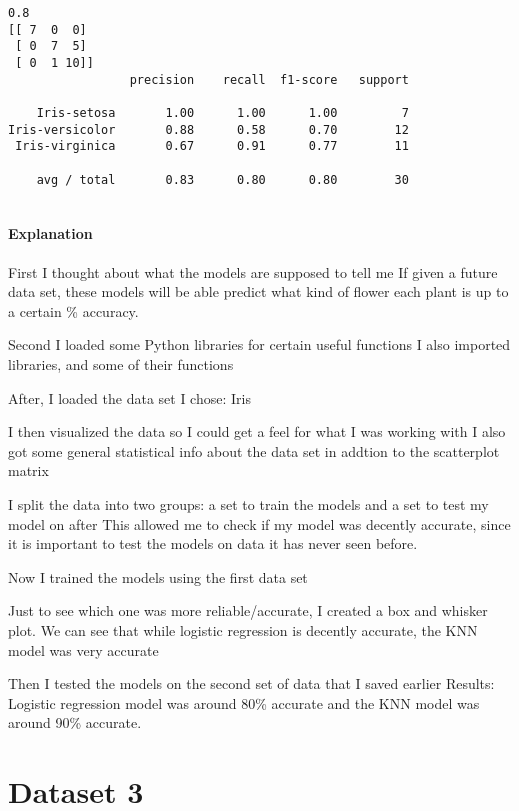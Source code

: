\documentclass[11pt]{article}
\begin{document}
    \begin{Verbatim}[commandchars=\\\{\}]
0.8
[[ 7  0  0]
 [ 0  7  5]
 [ 0  1 10]]
                 precision    recall  f1-score   support

    Iris-setosa       1.00      1.00      1.00         7
Iris-versicolor       0.88      0.58      0.70        12
 Iris-virginica       0.67      0.91      0.77        11

    avg / total       0.83      0.80      0.80        30


    \end{Verbatim}

    \paragraph{Explanation}\label{explanation}

First I thought about what the models are supposed to tell me If given a
future data set, these models will be able predict what kind of flower
each plant is up to a certain \% accuracy.

Second I loaded some Python libraries for certain useful functions I
also imported libraries, and some of their functions

After, I loaded the data set I chose: Iris

I then visualized the data so I could get a feel for what I was working
with I also got some general statistical info about the data set in
addtion to the scatterplot matrix

I split the data into two groups: a set to train the models and a set to
test my model on after This allowed me to check if my model was decently
accurate, since it is important to test the models on data it has never
seen before.

Now I trained the models using the first data set

Just to see which one was more reliable/accurate, I created a box and
whisker plot. We can see that while logistic regression is decently
accurate, the KNN model was very accurate

Then I tested the models on the second set of data that I saved earlier
Results: Logistic regression model was around 80\% accurate and the KNN
model was around 90\% accurate.

    \section{Dataset 3}\label{dataset-3}
\end{document}
